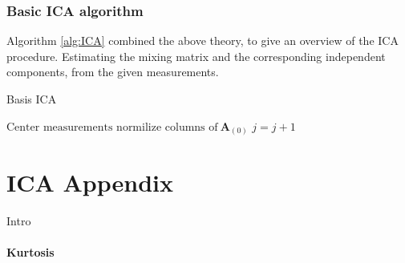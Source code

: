 \subsection{Basic ICA algorithm} 
Algorithm \ref{alg:ICA} combined the above theory, to give an overview of the ICA procedure. Estimating the mixing matrix and the corresponding independent components, from the given measurements. 
\begin{algorithm}[H]
\caption{Basis ICA}
\begin{algorithmic}[1]
			\State $\text{Center measurements}$ 
			\EndProcedure  
            \State$\text{normilize columns of} \ \textbf{A}_{(0)}$
                \State $j = j+1$
                
          		\EndWhile
          		\State 
            \EndProcedure
        \end{algorithmic} 
\end{algorithm}


\chapter{ICA Appendix}
Intro 



\subsubsection{Kurtosis}


 
